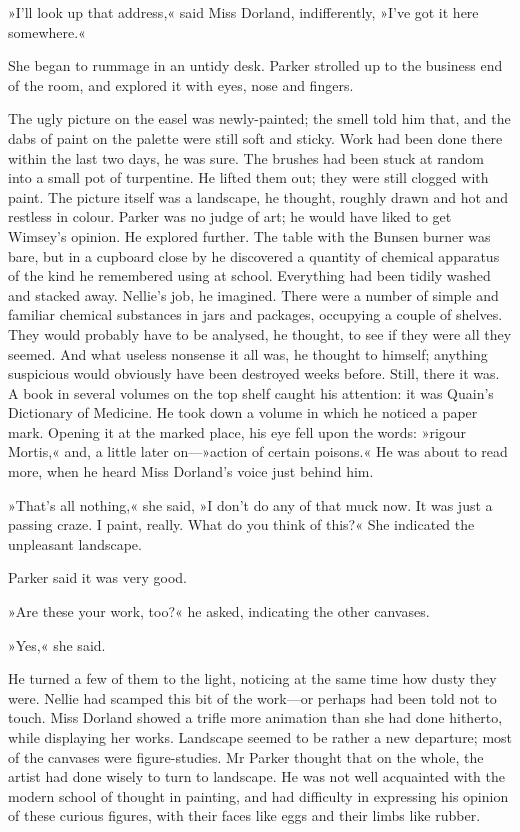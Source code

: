 »I'll look up that address,« said Miss Dorland, indifferently, »I've got it here somewhere.«

She began to rummage in an untidy desk. Parker strolled up to the business end of the room, and explored it with eyes, nose and fingers.

The ugly picture on the easel was newly-painted; the smell told him that, and the dabs of paint on the palette were still soft and sticky. Work had been done there within the last two days, he was sure. The brushes had been stuck at random into a small pot of turpentine. He lifted them out; they were still clogged with paint. The picture itself was a landscape, he thought, roughly drawn and hot and restless in colour. Parker was no judge of art; he would have liked to get Wimsey's opinion. He explored further. The table with the Bunsen burner was bare, but in a cupboard close by he discovered a quantity of chemical apparatus of the kind he remembered using at school. Everything had been tidily washed and stacked away. Nellie's job, he imagined. There were a number of simple and familiar chemical substances in jars and packages, occupying a couple of shelves. They would probably have to be analysed, he thought, to see if they were all they seemed. And what useless nonsense it all was, he thought to himself; anything suspicious would obviously have been destroyed weeks before. Still, there it was. A book in several volumes on the top shelf caught his attention: it was Quain's Dictionary of Medicine. He took down a volume in which he noticed a paper mark. Opening it at the marked place, his eye fell upon the words: »rigour Mortis,« and, a little later on—»action of certain poisons.« He was about to read more, when he heard Miss Dorland's voice just behind him.

»That's all nothing,« she said, »I don't do any of that muck now. It was just a passing craze. I paint, really. What do you think of this?« She indicated the unpleasant landscape.

Parker said it was very good.

»Are these your work, too?« he asked, indicating the other canvases.

»Yes,« she said.

He turned a few of them to the light, noticing at the same time how dusty they were. Nellie had scamped this bit of the work—or perhaps had been told not to touch. Miss Dorland showed a trifle more animation than she had done hitherto, while displaying her works. Landscape seemed to be rather a new departure; most of the canvases were figure-studies. Mr Parker thought that on the whole, the artist had done wisely to turn to landscape. He was not well acquainted with the modern school of thought in painting, and had difficulty in expressing his opinion of these curious figures, with their faces like eggs and their limbs like rubber.

